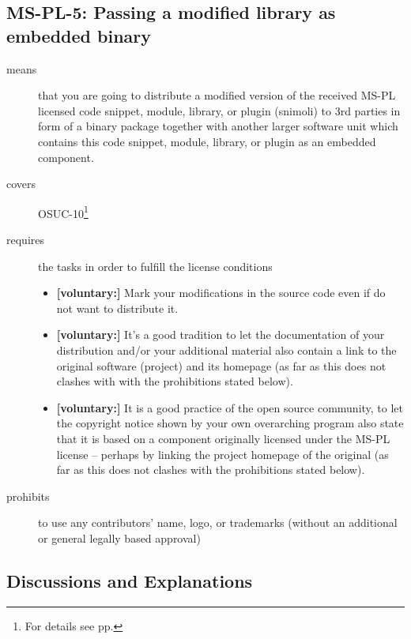 \subsection{MS-PL-5: Passing a modified library as embedded binary}
\label{OSUC-10-MS-PL}
\begin{description}
\item[means] that you are going to distribute a modified version of the received
MS-PL licensed code snippet, module, library, or plugin (snimoli) to 3rd parties
in form of a binary package together with another larger software unit which
contains this code snippet, module, library, or plugin as an embedded component.

\item[covers] OSUC-10\footnote{For details see pp. \pageref{OSUC-10-DEF}}
\item[requires] the tasks in order to fulfill the license conditions
\begin{itemize}
 
  \item \textbf{[voluntary:]} Mark your modifications in the source code even if
  do not want to distribute it.
  
  \item \textbf{[voluntary:]} It's a good tradition to let the documentation of
  your distribution and/or your additional material also contain a link to the
  original software (project) and its homepage (as far as this does not clashes
  with with the prohibitions stated below).
  
  \item \textbf{[voluntary:]} It is a good practice of the open source
  community, to let the copyright notice shown by your own overarching program
  also state that it is based on a component originally licensed under the MS-PL
  license -- perhaps by linking the project homepage of the original (as far as
  this does not clashes with the prohibitions stated below).
  
\end{itemize}

\item[prohibits] to use any contributors' name, logo, or trademarks (without an
additional or general legally based approval)

\end{description}

\subsection{Discussions and Explanations}

